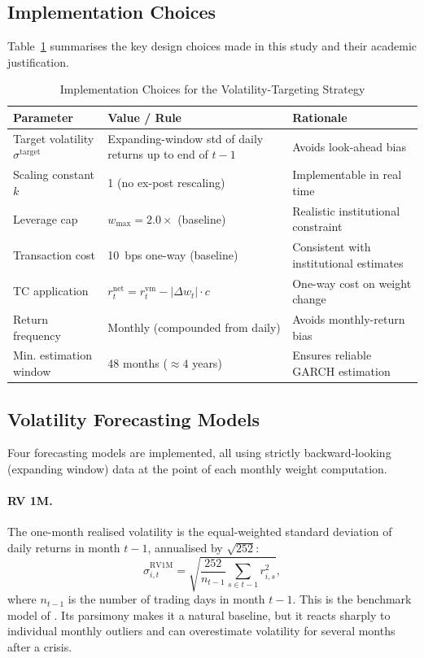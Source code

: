 \documentclass[12pt, a4paper]{article}
\newcommand{\stgt}{\sigma^{\mathrm{target}}}
\newcommand{\shat}{\hat{\sigma}}
\begin{document}
\subsection{Implementation Choices}
\label{sec:implementation}

Table~\ref{tab:implementation} summarises the key design choices made in this study and
their academic justification.

\begin{table}[H]
  \centering
  \caption{Implementation Choices for the Volatility-Targeting Strategy}
  \label{tab:implementation}
  \small
  \begin{tabularx}{\textwidth}{lXX}
    \toprule
    \textbf{Parameter} & \textbf{Value / Rule} & \textbf{Rationale} \\
    \midrule
    Target volatility $\stgt$ & Expanding-window std of daily returns up to end of $t-1$ & Avoids look-ahead bias \citep{Bongaerts2020} \\
    Scaling constant $k$ & 1 (no ex-post rescaling) & Implementable in real time \\
    Leverage cap & $w_{\max} = 2.0\times$ (baseline) & Realistic institutional constraint \\
    Transaction cost & 10~bps one-way (baseline) & Consistent with institutional estimates \citep{Frazzini2018} \\
    TC application & $r_t^{\mathrm{net}} = r_t^{\mathrm{vm}} - |\Delta w_t| \cdot c$ & One-way cost on weight change \\
    Return frequency & Monthly (compounded from daily) & Avoids monthly-return bias \\
    Min. estimation window & 48 months ($\approx 4$ years) & Ensures reliable GARCH estimation \\
    \bottomrule
  \end{tabularx}
\end{table}

\subsection{Volatility Forecasting Models}

Four forecasting models are implemented, all using strictly backward-looking (expanding
window) data at the point of each monthly weight computation.

\paragraph{RV 1M.} The one-month realised volatility is the equal-weighted standard
deviation of daily returns in month $t-1$, annualised by $\sqrt{252}$:
\begin{equation}
  \shat^{\mathrm{RV1M}}_{i,t} = \sqrt{\frac{252}{n_{t-1}} \sum_{s \in t-1} r_{i,s}^2},
\end{equation}
where $n_{t-1}$ is the number of trading days in month $t-1$. This is the benchmark
model of \citet{Moreira2017}. Its parsimony makes it a natural baseline, but it reacts
sharply to individual monthly outliers and can overestimate volatility for several months
after a crisis.
\end{document}

